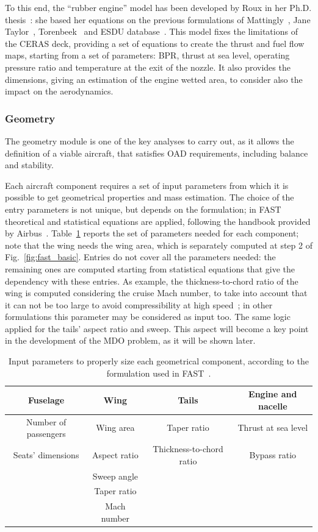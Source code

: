 To this end, the ``rubber engine'' model has been developed by Roux in her Ph.D. thesis~\cite{bib:roux}: she based her equations on the previous formulations of Mattingly~\cite{bib:mattingly}, Jane Taylor~\cite{bib:janes}, Torenbeek~\cite{bib:torenbeek} and ESDU database~\cite{bib:esdu}. 
This model fixes the limitations of the CERAS deck, providing a set of equations to create the thrust and fuel flow maps, starting from a set of parameters: BPR, thrust at sea level, operating pressure ratio and temperature at the exit of the nozzle. 
It also provides the dimensions, giving an estimation of the engine wetted area, to consider also the impact on the aerodynamics.

\subsubsection{Geometry}
\label{subsubsec:chap2_fast_geom}

The geometry module is one of the key analyses to carry out, as it allows the definition of a viable aircraft, that satisfies OAD requirements, including balance and stability. 

Each aircraft component requires a set of input parameters from which it is possible to get geometrical properties and mass estimation. 
The choice of the entry parameters is not unique, but depends on the formulation; in FAST theoretical and statistical equations are applied, following the handbook provided by Airbus~\cite{bib:airbus_notes}.
Table~\ref{tab:fast_geom_entry_parameter} reports the set of parameters needed for each component; note that the wing needs the wing area, which is separately computed at step 2 of Fig.~\ref{fig:fast_basic}.  
Entries do not cover all the parameters needed: the remaining ones are computed starting from statistical equations that give the dependency with these entries.
As example, the thickness-to-chord ratio of the wing is computed considering the cruise Mach number, to take into account that it can not be too large to avoid compressibility at high speed~\cite{bib:airbus_notes}; in other formulations this parameter may be considered as input too. 
The same logic applied for the tails' aspect ratio and sweep. 
This aspect will become a key point in the development of the MDO problem, as it will be shown later.
\begin{table}[!h]
	\centering
	\begin{tabular}{c c c c}
		\hline
		\textbf{Fuselage} & \textbf{Wing} & \textbf{Tails} & \textbf{Engine and nacelle} \\
		\hline
		Number of passengers & Wing area & Taper ratio & Thrust at sea level \\
		Seats' dimensions & Aspect ratio & Thickness-to-chord ratio & Bypass ratio \\
		& Sweep angle & & \\
		& Taper ratio & & \\ 
		& Mach number & & \\
		\hline
	\end{tabular}
	\caption{Input parameters to properly size each geometrical component, according to the formulation used in FAST~\cite{bib:airbus_notes}.}
	\label{tab:fast_geom_entry_parameter}
\end{table}

